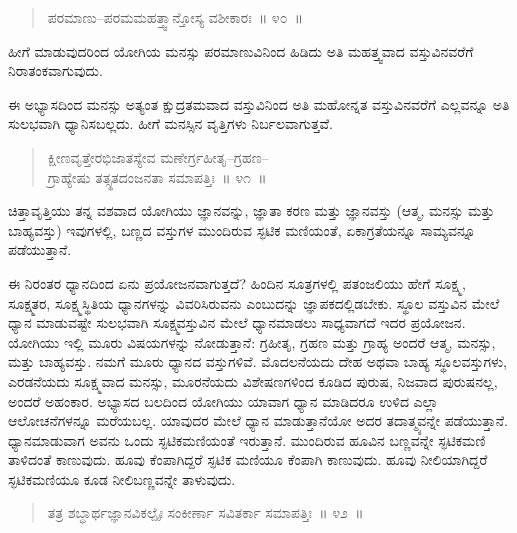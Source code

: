 \vspace{-0.3cm}

\begin{verse}
ಪರಮಾಣು–ಪರಮಮಹತ್ತ್ವಾನ್ತೋಸ್ಯ ವಶೀಕಾರಃ~॥ ೪೦~॥
\end{verse}

\vspace{-0.3cm}

ಹೀಗೆ ಮಾಡುವುದರಿಂದ ಯೋಗಿಯ ಮನಸ್ಸು ಪರಮಾಣುವಿನಿಂದ ಹಿಡಿದು ಅತಿ ಮಹತ್ತ್ವವಾದ ವಸ್ತುವಿನವರೆಗೆ ನಿರಾತಂಕವಾಗುವುದು. 

ಈ ಅಭ್ಯಾಸದಿಂದ ಮನಸ್ಸು ಅತ್ಯಂತ ಕ್ಷುದ್ರತಮವಾದ ವಸ್ತುವಿನಿಂದ ಅತಿ ಮಹೋನ್ನತ ವಸ್ತುವಿನವರೆಗೆ ಎಲ್ಲವನ್ನೂ ಅತಿ ಸುಲಭವಾಗಿ ಧ್ಯಾನಿಸಬಲ್ಲದು. ಹೀಗೆ ಮನಸ್ಸಿನ ವೃತ್ತಿಗಳು ನಿರ್ಬಲವಾಗುತ್ತವೆ. 

\vspace{-0.3cm}

\begin{verse}
ಕ್ಷೀಣವೃತ್ತೇರಭಿಜಾತಸ್ಯೇವ ಮಣೇರ್ಗ್ರಹೀತೃ–ಗ್ರಹಣ–\\ಗ್ರಾಹ್ಯೇಷು ತತ್ಸ್ಥತದಂಜನತಾ ಸಮಾಪತ್ತಿಃ~॥ ೪೧~॥
\end{verse}

\vspace{-0.3cm}

ಚಿತ್ತಾವೃತ್ತಿಯು ತನ್ನ ವಶವಾದ ಯೋಗಿಯು ಜ್ಞಾನವನ್ನು, ಜ್ಞಾತಾ ಕರಣ ಮತ್ತು ಜ್ಞಾನವಸ್ತು (ಆತ್ಮ, ಮನಸ್ಸು ಮತ್ತು ಬಾಹ್ಯವಸ್ತು) ಇವುಗಳಲ್ಲಿ, ಬಣ್ಣದ ವಸ್ತುಗಳ ಮುಂದಿರುವ ಸ್ಫಟಿಕ ಮಣಿಯಂತೆ, ಏಕಾಗ್ರತೆಯನ್ನೂ ಸಾಮ್ಯವನ್ನೂ ಪಡೆಯುತ್ತಾನೆ. 

ಈ ನಿರಂತರ ಧ್ಯಾನದಿಂದ ಏನು ಪ್ರಯೋಜನವಾಗುತ್ತದೆ? ಹಿಂದಿನ ಸೂತ್ರಗಳಲ್ಲಿ ಪತಂಜಲಿಯು ಹೇಗೆ ಸೂಕ್ಷ್ಮ, ಸೂಕ್ಷ್ಮತರ, ಸೂಕ್ಷ್ಮಸ್ಥಿತಿಯ ಧ್ಯಾನಗಳನ್ನು ವಿವರಿಸಿರುವನು ಎಂಬುದನ್ನು ಜ್ಞಾಪಕದಲ್ಲಿಡಬೇಕು. ಸ್ಥೂಲ ವಸ್ತುವಿನ ಮೇಲೆ ಧ್ಯಾನ ಮಾಡುವಷ್ಟೇ ಸುಲಭವಾಗಿ ಸೂಕ್ಷ್ಮವಸ್ತುವಿನ ಮೇಲೆ ಧ್ಯಾನಮಾಡಲು ಸಾಧ್ಯವಾಗದೆ ಇದರ ಪ್ರಯೋಜನ. ಯೋಗಿಯು ಇಲ್ಲಿ ಮೂರು ವಿಷಯಗಳನ್ನು ನೋಡುತ್ತಾನೆ: ಗ್ರಹೀತೃ, ಗ್ರಹಣ ಮತ್ತು ಗ್ರಾಹ್ಯ ಅಂದರೆ ಆತ್ಮ, ಮನಸ್ಸು, ಮತ್ತು ಬಾಹ್ಯವಸ್ತು. ನಮಗೆ ಮೂರು ಧ್ಯಾನದ ವಸ್ತುಗಳಿವೆ. ಮೊದಲನೆಯದು ದೇಹ ಅಥವಾ ಬಾಹ್ಯ ಸ್ಥೂಲವಸ್ತುಗಳು, ಎರಡನೆಯದು ಸೂಕ್ಷ್ಮವಾದ ಮನಸ್ಸು, ಮೂರನೆಯದು ವಿಶೇಷಣಗಳಿಂದ ಕೂಡಿದ ಪುರುಷ, ನಿಜವಾದ ಪುರುಷನಲ್ಲ, ಅಂದರೆ ಅಹಂಕಾರ. ಅಭ್ಯಾಸದ ಬಲದಿಂದ ಯೋಗಿಯು ಯಾವಾಗ ಧ್ಯಾನ ಮಾಡಿದರೂ ಉಳಿದ ಎಲ್ಲಾ ಆಲೋಚನೆಗಳನ್ನೂ ಮರೆಯಬಲ್ಲ. ಯಾವುದರ ಮೇಲೆ ಧ್ಯಾನ ಮಾಡುತ್ತಾನೆಯೋ ಅದರ ತದಾತ್ಮ್ಯವನ್ನೇ ಪಡೆಯುತ್ತಾನೆ. ಧ್ಯಾನಮಾಡುವಾಗ ಅವನು ಒಂದು ಸ್ಫಟಿಕಮಣಿಯಂತೆ ಇರುತ್ತಾನೆ. ಮುಂದಿರುವ ಹೂವಿನ ಬಣ್ಣವನ್ನೇ ಸ್ಫಟಿಕಮಣಿ ತಾಳಿದಂತೆ ಕಾಣುವುದು. ಹೂವು ಕೆಂಪಾಗಿದ್ದರೆ ಸ್ಫಟಿಕ ಮಣಿಯೂ ಕೆಂಪಾಗಿ ಕಾಣುವುದು. ಹೂವು ನೀಲಿಯಾಗಿದ್ದರೆ ಸ್ಫಟಿಕಮಣಿಯೂ ಕೂಡ ನೀಲಿಬಣ್ಣವನ್ನೇ ತಾಳುವುದು. 

\vspace{-0.3cm}

\begin{verse}
ತತ್ರ ಶಬ್ಧಾರ್ಥಜ್ಞಾನವಿಕಲ್ಪೈಃ ಸಂಕೀರ್ಣಾ ಸವಿತರ್ಕಾ ಸಮಾಪತ್ತಿಃ~॥ ೪೨~॥
\end{verse}

